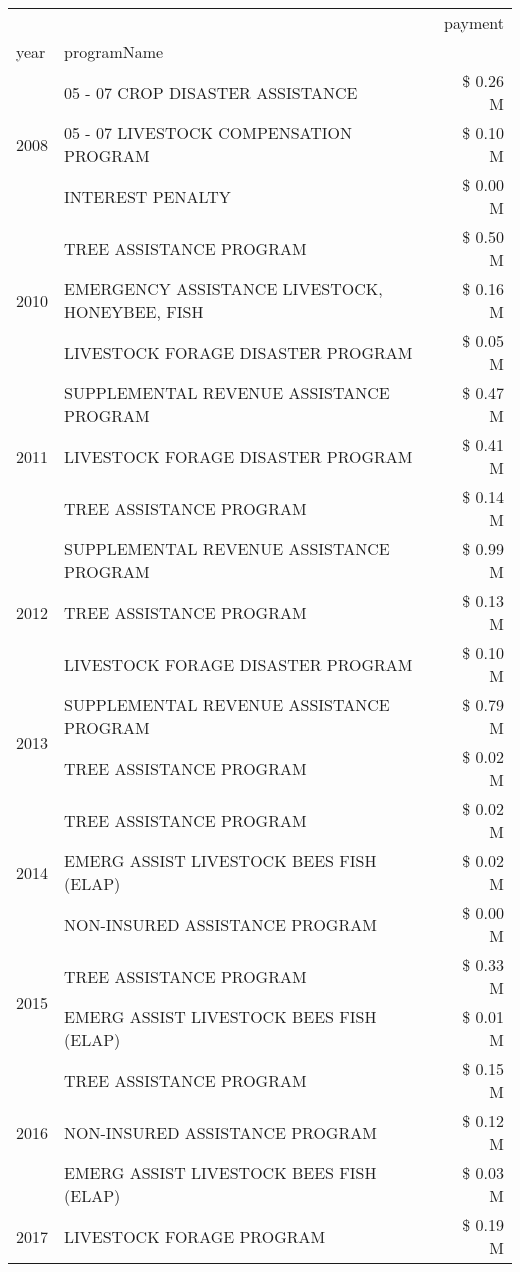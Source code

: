 \begin{tabular}{llr}
\toprule
 &  & payment \\
year & programName &  \\
\midrule
\multirow[t]{3}{*}{2008} & 05 - 07 CROP DISASTER ASSISTANCE & \$ 0.26 M \\
 & 05 - 07 LIVESTOCK COMPENSATION PROGRAM & \$ 0.10 M \\
 & INTEREST PENALTY & \$ 0.00 M \\
\cline{1-3}
\multirow[t]{3}{*}{2010} & TREE ASSISTANCE PROGRAM & \$ 0.50 M \\
 & EMERGENCY ASSISTANCE LIVESTOCK, HONEYBEE, FISH & \$ 0.16 M \\
 & LIVESTOCK FORAGE DISASTER  PROGRAM & \$ 0.05 M \\
\cline{1-3}
\multirow[t]{3}{*}{2011} & SUPPLEMENTAL REVENUE ASSISTANCE PROGRAM & \$ 0.47 M \\
 & LIVESTOCK FORAGE DISASTER PROGRAM & \$ 0.41 M \\
 & TREE ASSISTANCE PROGRAM & \$ 0.14 M \\
\cline{1-3}
\multirow[t]{3}{*}{2012} & SUPPLEMENTAL REVENUE ASSISTANCE PROGRAM & \$ 0.99 M \\
 & TREE ASSISTANCE PROGRAM & \$ 0.13 M \\
 & LIVESTOCK FORAGE DISASTER PROGRAM & \$ 0.10 M \\
\cline{1-3}
\multirow[t]{2}{*}{2013} & SUPPLEMENTAL REVENUE ASSISTANCE PROGRAM & \$ 0.79 M \\
 & TREE ASSISTANCE PROGRAM & \$ 0.02 M \\
\cline{1-3}
\multirow[t]{3}{*}{2014} & TREE ASSISTANCE PROGRAM & \$ 0.02 M \\
 & EMERG ASSIST LIVESTOCK BEES FISH (ELAP) & \$ 0.02 M \\
 & NON-INSURED ASSISTANCE PROGRAM & \$ 0.00 M \\
\cline{1-3}
\multirow[t]{2}{*}{2015} & TREE ASSISTANCE PROGRAM & \$ 0.33 M \\
 & EMERG ASSIST LIVESTOCK BEES FISH (ELAP) & \$ 0.01 M \\
\cline{1-3}
\multirow[t]{3}{*}{2016} & TREE ASSISTANCE PROGRAM                       & \$ 0.15 M \\
 & NON-INSURED ASSISTANCE PROGRAM                & \$ 0.12 M \\
 & EMERG ASSIST LIVESTOCK BEES FISH (ELAP)       & \$ 0.03 M \\
\cline{1-3}
\multirow[t]{3}{*}{2017} & LIVESTOCK FORAGE PROGRAM & \$ 0.19 M \\

\end{tabular}
